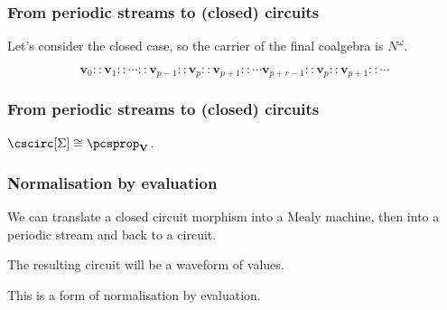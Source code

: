 \begin{frame}
    \frametitle{From periodic streams to (closed) circuits}

    Let's consider the \alert{closed} case, so the carrier of the final coalgebra is $N^\omega$.

    \pause

    \[ \textbf{v}_0 :: \textbf{v}_1 :: \cdots :: \textbf{v}_{p-1} :: \textbf{v}_{p} :: \textbf{v}_{p+1} :: \cdots \textbf{v}_{p+r-1} :: \textbf{v}_{p} :: \textbf{v}_{p+1} :: \cdots\]

    \pause

    \begin{center}
    \end{center}

\end{frame}

\begin{frame}
    \frametitle{From periodic streams to (closed) circuits}
        \pause

        \begin{center}

            \pause

            \vspace{1em}

        \end{center}
    
        \vspace{1em}

        \pause

        \begin{theorem}
            $\cscirc[\Sigma] \cong {\pcsprop}_{\textbf{V}}$.
        \end{theorem}
\end{frame}

\begin{frame}
    \frametitle{Normalisation by evaluation}

    \pause

    We can translate a closed circuit morphism into a Mealy machine, then into a periodic stream and back to a circuit.

    \pause

    The resulting circuit will be a \alert{waveform} of values.
    
    \pause

    This is a form of \alert{normalisation by evaluation}.

\end{frame}